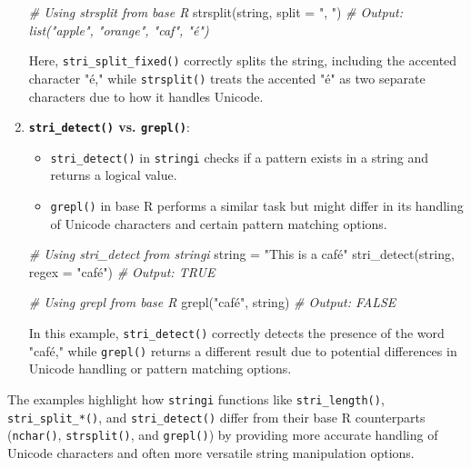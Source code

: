 \documentclass[
]{article}
\newenvironment{Shaded}{}{}
\newcommand{\AttributeTok}[1]{\textcolor[rgb]{0.49,0.56,0.16}{#1}}
\newcommand{\CommentTok}[1]{\textcolor[rgb]{0.38,0.63,0.69}{\textit{#1}}}
\newcommand{\FunctionTok}[1]{\textcolor[rgb]{0.02,0.16,0.49}{#1}}
\newcommand{\NormalTok}[1]{#1}
\newcommand{\OtherTok}[1]{\textcolor[rgb]{0.00,0.44,0.13}{#1}}
\newcommand{\StringTok}[1]{\textcolor[rgb]{0.25,0.44,0.63}{#1}}
\begin{document}
\begin{enumerate}
\begin{Shaded}
\begin{Highlighting}[]
\CommentTok{\# Using strsplit from base R}
\FunctionTok{strsplit}\NormalTok{(string, }\AttributeTok{split =} \StringTok{", "}\NormalTok{)}
\CommentTok{\# Output: list("apple", "orange", "caf", "é")}
\end{Highlighting}
\end{Shaded}

  Here, \texttt{stri\_split\_fixed()} correctly splits the string,
  including the accented character "é," while \texttt{strsplit()} treats
  the accented "é" as two separate characters due to how it handles
  Unicode.
\item
  \textbf{\texttt{stri\_detect()} vs. \texttt{grepl()}}:

  \begin{itemize}
  \item
    \texttt{stri\_detect()} in \texttt{stringi} checks if a pattern
    exists in a string and returns a logical value.
  \item
    \texttt{grepl()} in base R performs a similar task but might differ
    in its handling of Unicode characters and certain pattern matching
    options.
  \end{itemize}

\begin{Shaded}
\begin{Highlighting}[]
\CommentTok{\# Using stri\_detect from stringi}
\NormalTok{string }\OtherTok{=} \StringTok{"This is a café"}
\FunctionTok{stri\_detect}\NormalTok{(string, }\AttributeTok{regex =} \StringTok{"café"}\NormalTok{)}
\CommentTok{\# Output: TRUE}

\CommentTok{\# Using grepl from base R}
\FunctionTok{grepl}\NormalTok{(}\StringTok{"café"}\NormalTok{, string)}
\CommentTok{\# Output: FALSE}
\end{Highlighting}
\end{Shaded}

  In this example, \texttt{stri\_detect()} correctly detects the
  presence of the word "café," while \texttt{grepl()} returns a
  different result due to potential differences in Unicode handling or
  pattern matching options.
\end{enumerate}

The examples highlight how \texttt{stringi} functions like
\texttt{stri\_length()}, \texttt{stri\_split\_*()}, and
\texttt{stri\_detect()} differ from their base R counterparts
(\texttt{nchar()}, \texttt{strsplit()}, and \texttt{grepl()}) by
providing more accurate handling of Unicode characters and often more
versatile string manipulation options.
\end{document}
